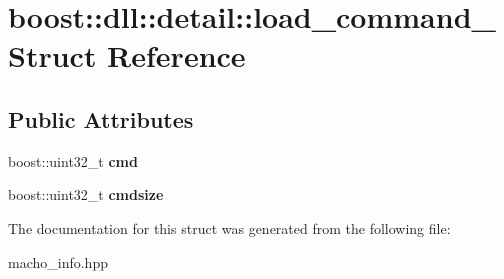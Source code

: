 \hypertarget{a01548}{}\section{boost\+:\+:dll\+:\+:detail\+:\+:load\+\_\+command\+\_\+ Struct Reference}
\label{a01548}
\subsection*{Public Attributes}
\begin{DoxyCompactItemize}
\item 
\mbox{\label{a01548_ad2d445796603c2fa9984f860d9533701}} 
boost\+::uint32\+\_\+t {\bfseries cmd}
\item 
\mbox{\label{a01548_a51e8ce5c424cfe9bbd0d52eb817d23ff}} 
boost\+::uint32\+\_\+t {\bfseries cmdsize}
\end{DoxyCompactItemize}


The documentation for this struct was generated from the following file\+:\begin{DoxyCompactItemize}
\item 
macho\+\_\+info.\+hpp\end{DoxyCompactItemize}
